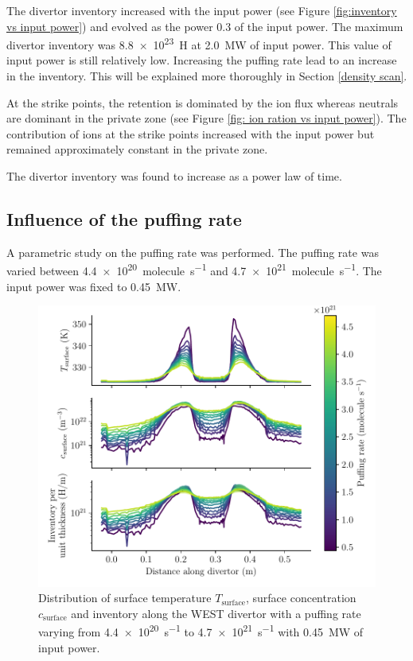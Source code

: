 The divertor inventory increased with the input power (see Figure \ref{fig:inventory vs input power}) and evolved as the power 0.3 of the input power.
The maximum divertor inventory was \SI{8.8e23}{H} at \SI{2.0}{MW} of input power.
This value of input power is still relatively low.
Increasing the puffing rate lead to an increase in the inventory.
This will be explained more thoroughly in Section \ref{density scan}.

At the strike points, the retention is dominated by the ion flux whereas neutrals are dominant in the private zone (see Figure \ref{fig: ion ration vs input power}).
The contribution of ions at the strike points increased with the input power but remained approximately constant in the private zone.

The divertor inventory was found to increase as a power law of time.


\subsection{Influence of the puffing rate}

A parametric study on the puffing rate was performed.
The puffing rate was varied between \SI{4.4e20}{molecule.s^{-1}} and \SI{4.7e21}{molecule.s^{-1}}.
The input power was fixed to \SI{0.45}{MW}.

\begin{figure}[h]
    \centering
    \includegraphics[width=\linewidth]{Figures/divertor/WEST/inventory_along_divertor.pdf}
    \caption{Distribution of surface temperature $T_\mathrm{surface}$, surface concentration $c_\mathrm{surface}$ and inventory along the WEST divertor with a puffing rate varying from \SI{4.4e20}{s^{-1}} to \SI{4.7e21}{s^{-1}} with \SI{0.45}{MW} of input power.}
    \label{fig: divertor distr density scan}
\end{figure}

